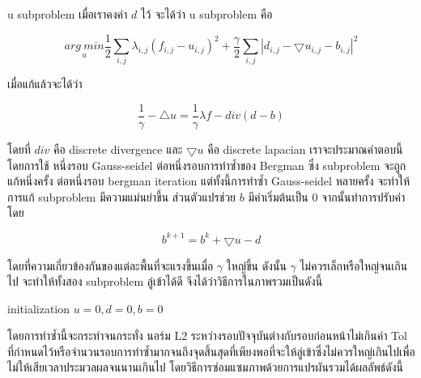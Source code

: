\documentclass[hidelinks,a4paper,14pt]{article}
\numberwithin{equation}{section}							%
\begin{document}
{	u subproblem เมื่อเราคงค่า $d$ ไว้ จะได้ว่า u subproblem คือ
	
	$$ \underset{u}{arg \ min} \frac{1}{2} \sum_{i,j} \lambda_{i,j}  (f_{i,j} - u_{i,j})^2 + \frac{\gamma}{2} \sum_{i,j} |d_{i,j} - \bigtriangledown u_{i,j} - b_{i,j}|^2$$
	
	เมื่อแก้แล้วจะได้ว่า
	
	$$ \frac{1}{\gamma} - \bigtriangleup u = \frac{1}{\gamma} \lambda f - div (d-b)$$
	
	โดยที่ $div$ คือ discrete divergence และ $\bigtriangledown u$ คือ discrete lapacian เราจะประมาณคำตอบนี้โดยการใช้ หนึ่งรอบ Gauss-seidel ต่อหนึ่งรอบการทำซ้ำของ Bergman ซึ่ง subproblem จะถูกแก้หนึ่งครั้ง ต่อหนึ่งรอบ bergman iteration แต่ทั้งนี้การทำซ้ำ Gauss-seidel หลายครั้ง จะทำให้การแก้ subproblem มีความแม่นยำขึ้น
	ส่วนตัวแปรช่วย $b$ มีค่าเริ่มต้นเป็น 0 จากนั้นทำการปรับค่าโดย
	
	$$ b^{k+1} = b^k  + \bigtriangledown u - d $$
	
	โดยที่ความเกี่ยวข้องกันของแต่ละพื้นที่จะแรงขึ้นเมื่อ $\gamma$ ใหญ่ขึ้น ดังนั้น $\gamma$ ไม่ควรเล็กหรือใหญ่จนเกินไป จะทำให้ทั้งสอง subproblem ลู่เข้าได้ดี
	จึงได้ว่าวิธีการในภาพรวมเป็นดังนี้
	


	\begin{algorithm}[H]
		\begin{framed}
		initialization $u = 0, d = 0, b = 0$\\
	\end{framed}
\end{algorithm}


	
	โดยการทำซ้ำนี้จะกระทำจนกระทั่ง นอร์ม L2 ระหว่างรอบปัจจุบันต่างกับรอบก่อนหน้าไม่เกินค่า Tol ที่กำหนดไว้หรือจำนวนรอบการทำซ้ำมากจนถึงจุดสิ้นสุดที่เพียงพอที่จะให้ลู่เข้าซึ่งไม่ควรใหญ่เกินไปเพื่อไม่ให้เสียเวลาประมวลผลจนนานเกินไป โดยวิธีการซ่อมแซมภาพด้วยการแปรผันรวมได้ผลลัพธ์ดังนี้ \cite{ref:splitbergman-inpaint}
	
}
\end{document}
